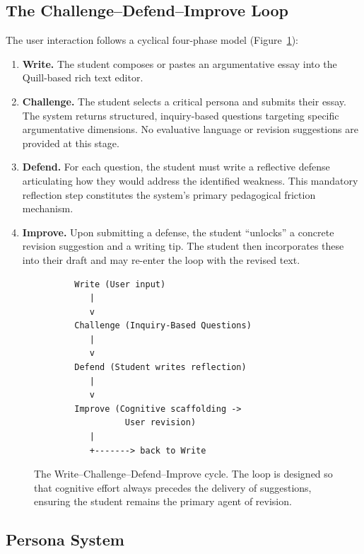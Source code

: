\documentclass[11pt,a4paper]{article}
\begin{document}
\subsection{The Challenge--Defend--Improve Loop}

The user interaction follows a cyclical four-phase model (Figure~\ref{fig:user_loop}):

\begin{enumerate}[leftmargin=*]
    \item \textbf{Write.} The student composes or pastes an argumentative essay into the Quill-based rich text editor.

    \item \textbf{Challenge.} The student selects a critical persona and submits their essay. The system returns structured, inquiry-based questions targeting specific argumentative dimensions. No evaluative language or revision suggestions are provided at this stage.

    \item \textbf{Defend.} For each question, the student must write a reflective defense articulating how they would address the identified weakness. This mandatory reflection step constitutes the system's primary pedagogical friction mechanism.

    \item \textbf{Improve.} Upon submitting a defense, the student ``unlocks'' a concrete revision suggestion and a writing tip. The student then incorporates these into their draft and may re-enter the loop with the revised text.
\end{enumerate}

\begin{figure}[ht]
\centering
\begin{BVerbatim}
        Write (User input)
           |
           v
        Challenge (Inquiry-Based Questions)
           |
           v
        Defend (Student writes reflection)
           |
           v
        Improve (Cognitive scaffolding ->
                  User revision)
           |
           +-------> back to Write
\end{BVerbatim}
\caption{The Write--Challenge--Defend--Improve cycle. The loop is designed so that cognitive effort always precedes the delivery of suggestions, ensuring the student remains the primary agent of revision.}
\label{fig:user_loop}
\end{figure}

\subsection{Persona System}
\end{document}

